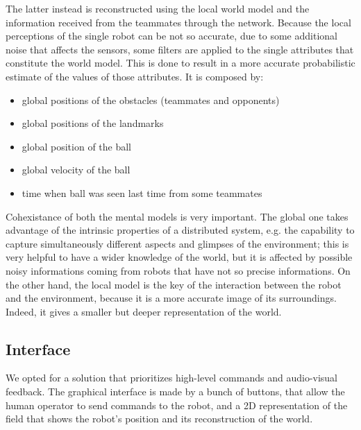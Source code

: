 \documentclass[a4paper, onecolumn, 12pt]{article}
\begin{document}
The latter instead is reconstructed using the local world model and the information
received from the teammates through the network. Because the local perceptions of the 
single robot can be not so accurate, due to some additional noise that affects the sensors,
some filters are applied to the single attributes that constitute the world model. This 
is done to result in a more accurate probabilistic estimate of the values of those attributes.
It is composed by:
\begin{itemize}
    \item global positions of the obstacles (teammates and opponents)
    \item global positions of the landmarks
    \item global position of the ball
    \item global velocity of the ball
    \item time when ball was seen last time from some teammates
\end{itemize}

Cohexistance of both the mental models is very important.
The global one takes advantage of the intrinsic properties of a 
distributed system, e.g. the capability to capture simultaneously different
aspects and glimpses of the environment; this is very helpful to have a wider
knowledge of the world, but it is affected by possible noisy informations coming 
from robots that have not so precise informations.
On the other hand, the local model is the key of the interaction between the robot and
the environment, because it is a more accurate image of its surroundings.
Indeed, it gives a smaller but deeper representation of the world.



\subsection{Interface}

We opted for a solution that prioritizes high-level commands and audio-visual
feedback. The graphical interface is made by a bunch of buttons, that allow the
human operator to send commands to the robot, and a 2D representation of the
field that shows the robot's position and its reconstruction of the world.  
\end{document}
